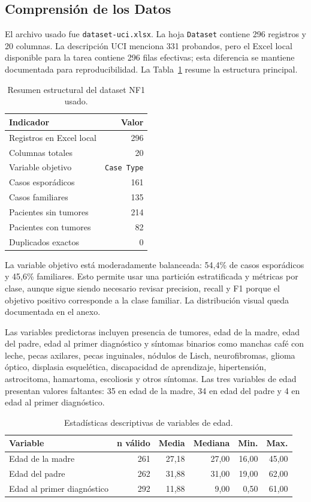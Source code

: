 \documentclass[10pt,a4paper]{article}
\begin{document}
\subsection{Comprensión de los Datos}

El archivo usado fue \texttt{dataset-uci.xlsx}. La hoja \texttt{Dataset} contiene 296 registros y 20 columnas. La descripción UCI menciona 331 probandos, pero el Excel local disponible para la tarea contiene 296 filas efectivas; esta diferencia se mantiene documentada para reproducibilidad. La Tabla~\ref{tab:estructura_datos} resume la estructura principal.

\begin{table}[H]
\centering
\begin{tabular}{lr}
\toprule
Indicador & Valor \\
\midrule
Registros en Excel local & 296 \\
Columnas totales & 20 \\
Variable objetivo & \texttt{Case Type} \\
Casos esporádicos & 161 \\
Casos familiares & 135 \\
Pacientes sin tumores & 214 \\
Pacientes con tumores & 82 \\
Duplicados exactos & 0 \\
\bottomrule
\end{tabular}
\caption{Resumen estructural del dataset NF1 usado.}
\label{tab:estructura_datos}
\end{table}

La variable objetivo está moderadamente balanceada: 54,4\% de casos esporádicos y 45,6\% familiares. Esto permite usar una partición estratificada y métricas por clase, aunque sigue siendo necesario revisar precision, recall y F1 porque el objetivo positivo corresponde a la clase familiar. La distribución visual queda documentada en el anexo.

Las variables predictoras incluyen presencia de tumores, edad de la madre, edad del padre, edad al primer diagnóstico y síntomas binarios como manchas café con leche, pecas axilares, pecas inguinales, nódulos de Lisch, neurofibromas, glioma óptico, displasia esquelética, discapacidad de aprendizaje, hipertensión, astrocitoma, hamartoma, escoliosis y otros síntomas. Las tres variables de edad presentan valores faltantes: 35 en edad de la madre, 34 en edad del padre y 4 en edad al primer diagnóstico.

\begin{table}[H]
\centering
\small
\begin{tabular}{lrrrrr}
\toprule
Variable & n válido & Media & Mediana & Min. & Max. \\
\midrule
Edad de la madre & 261 & 27,18 & 27,00 & 16,00 & 45,00 \\
Edad del padre & 262 & 31,88 & 31,00 & 19,00 & 62,00 \\
Edad al primer diagnóstico & 292 & 11,88 & 9,00 & 0,50 & 61,00 \\
\bottomrule
\end{tabular}
\caption{Estadísticas descriptivas de variables de edad.}
\label{tab:edades}
\end{table}
\end{document}
